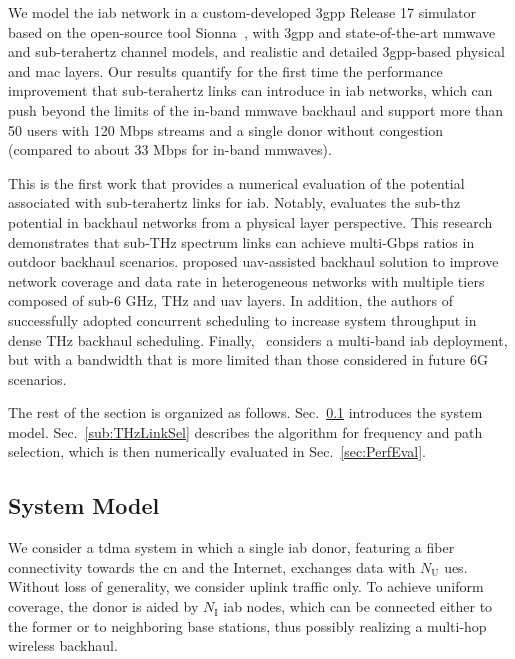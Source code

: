 We model the \gls{iab} network in a custom-developed \gls{3gpp} Release 17 simulator based on the open-source tool Sionna~\cite{hoydis2022sionna}, with \gls{3gpp} and state-of-the-art \gls{mmwave} and sub-terahertz channel models, and realistic and detailed \gls{3gpp}-based physical and \gls{mac} layers. Our results quantify for the first time the performance improvement that sub-terahertz links can introduce in \gls{iab} networks, which can push beyond the limits of the in-band \gls{mmwave} backhaul and support more than 50 users with 120 Mbps streams and a single donor without congestion (compared to about 33 Mbps for in-band \glspl{mmwave}). 

This is the first work that provides a numerical evaluation of the potential associated with sub-terahertz links for \gls{iab}. Notably, \cite{9135258} evaluates the sub-\gls{thz} potential in backhaul networks from a physical layer perspective. This research demonstrates that sub-THz spectrum links can achieve multi-Gbps ratios in outdoor backhaul scenarios. \cite{9163026} proposed \gls{uav}-assisted backhaul solution to improve network coverage and data rate in heterogeneous networks with multiple tiers composed of sub-6 GHz, THz and \gls{uav} layers. In addition, the authors of \cite{9136652} successfully adopted concurrent scheduling to increase system throughput in dense THz backhaul scheduling. Finally,~\cite{saha2018integrated} considers a multi-band \gls{iab} deployment, but with a bandwidth that is more limited than those considered in future 6G scenarios. 

The rest of the section is organized as follows. Sec.~\ref{sec:system} introduces the system model. Sec.~\ref{sub:THzLinkSel} describes the algorithm for frequency and path selection, which is then numerically evaluated in Sec.~\ref{sec:PerfEval}.

\subsection{System Model}
\label{sec:system}

We consider a \gls{tdma} system in which a single \gls{iab} donor, featuring a fiber connectivity towards the \gls{cn} and the Internet, exchanges data with $N_{\mathrm{U}}$ \glspl{ue}. Without loss of generality, we consider uplink traffic only.
To achieve uniform coverage, the donor is aided by $N_{\mathrm{I}}$ \gls{iab} nodes, which can be connected either to the former or to neighboring base stations, thus possibly realizing a multi-hop wireless backhaul. 

